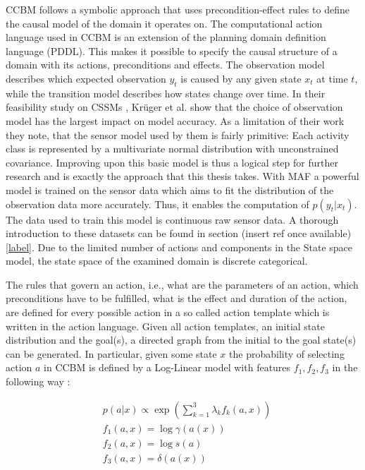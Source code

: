 \documentclass[11pt,titlepage,oneside,openany]{book}
\begin{document}
CCBM follows a symbolic approach that uses precondition-effect rules to define the causal model of the domain it operates on. The computational action language used in CCBM is an extension of the planning domain definition language (PDDL). This makes it possible to specify the causal structure of a domain with its actions, preconditions and effects. The observation model describes which expected observation $y_t$ is caused by any given state $x_t$ at time $t$, while the transition model describes how states change over time. In their feasibility study on CSSMs \cite{kruger_computational_2014}, Kr\"uger et al. show that the choice of observation model has the largest impact on model accuracy. As a limitation of their work they note, that the sensor model used by them is fairly primitive: Each activity class is represented by a multivariate normal distribution with unconstrained covariance. Improving upon this basic model is thus a logical step for further research and is exactly the approach that this thesis takes. With MAF a powerful model is trained on the sensor data which aims to fit the distribution of the observation data more accurately. Thus, it enables the computation of $p(y_t|x_t)$. The data used to train this model is continuous raw sensor data. A thorough introduction to these datasets can be found in section (insert ref once available)\ref{label}. Due to the limited number of actions and components in the State space model, the state space of the examined domain is discrete categorical.

The rules that govern an action, i.e., what are the parameters of an action, which preconditions have to be fulfilled, what is the effect and duration of the action, are defined for every possible action in a so called action template which is written in the action language. Given all action templates, an initial state distribution and the goal(s), a directed graph from the initial to the goal state(s) can be generated. In particular, given some state $x$ the probability of selecting action $a$ in CCBM is defined by a Log-Linear model with features $f_1, f_2, f_3$ in the following way \cite{rueda_combining_2019}:

\begin{align}
	&p(a|x) \propto 	\exp(\sum_{k=1}^{3} \lambda_k f_k(a,x)) \label{func:ccbm} \\
	&f_1(a,x) = 		\log \gamma(a(x)) \\
	&f_2(a,x) = 		\log s(a) \\
	&f_3(a,x) = 		\delta(a(x))
\end{align}
\end{document}
